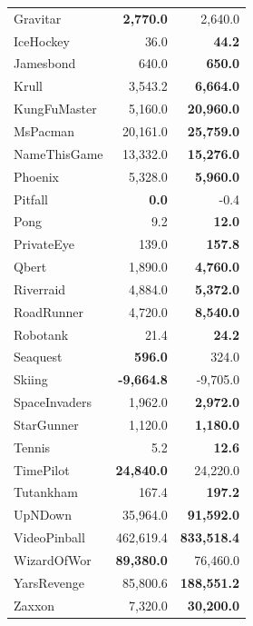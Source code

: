 \begin{table}[ht]
\begin{center}
\begin{small}
\begin{tabular}{lrr}
Gravitar       & \textbf{2,770.0}   & 2,640.0            \\
IceHockey      & 36.0               & \textbf{44.2}      \\
Jamesbond      & 640.0              & \textbf{650.0}     \\
Krull          & 3,543.2            & \textbf{6,664.0}   \\
KungFuMaster   & 5,160.0            & \textbf{20,960.0}  \\
MsPacman       & 20,161.0           & \textbf{25,759.0}  \\
NameThisGame   & 13,332.0           & \textbf{15,276.0}  \\
Phoenix        & 5,328.0            & \textbf{5,960.0}   \\
Pitfall        & \textbf{0.0}       & -0.4               \\
Pong           & 9.2                & \textbf{12.0}      \\
PrivateEye     & 139.0              & \textbf{157.8}     \\
Qbert          & 1,890.0            & \textbf{4,760.0}   \\
Riverraid      & 4,884.0            & \textbf{5,372.0}   \\
RoadRunner     & 4,720.0            & \textbf{8,540.0}   \\
Robotank       & 21.4               & \textbf{24.2}      \\
Seaquest       & \textbf{596.0}     & 324.0              \\
Skiing         & \textbf{-9,664.8}  & -9,705.0           \\
SpaceInvaders  & 1,962.0            & \textbf{2,972.0}   \\
StarGunner     & {1,120.0}          & \textbf{1,180.0}   \\
Tennis         & {5.2}              & \textbf{12.6}      \\
TimePilot      & \textbf{24,840.0}  & 24,220.0           \\
Tutankham      & 167.4              & \textbf{197.2}     \\
UpNDown        & 35,964.0           & \textbf{91,592.0}  \\
VideoPinball   & {462,619.4}        & \textbf{833,518.4} \\
WizardOfWor    & \textbf{89,380.0}  & 76,460.0           \\
YarsRevenge    & 85,800.6           & \textbf{188,551.2} \\
Zaxxon         & 7,320.0            & \textbf{30,200.0} \\


\end{tabular}
\end{small}
\end{center}
\end{table}
